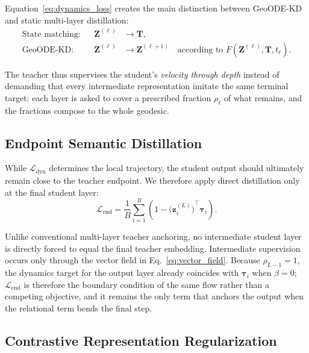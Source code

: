 \documentclass[11pt]{article}
\begin{document}
Equation~\eqref{eq:dynamics_loss} creates the main distinction between
GeoODE-KD and static multi-layer distillation:
\begin{align}
    \text{State matching:}
    &&
    \mathbf{Z}^{(\ell)}
    &\rightarrow
    \mathbf{T},
    \\
    \text{GeoODE-KD:}
    &&
    \mathbf{Z}^{(\ell)}
    &\rightarrow
    \mathbf{Z}^{(\ell+1)}
    \quad
    \text{according to }
    F(
        \mathbf{Z}^{(\ell)},\mathbf{T},t_\ell
    ).
\end{align}

The teacher thus supervises the student's \emph{velocity through depth}
instead of demanding that every intermediate representation imitate the
same terminal target: each layer is asked to cover a prescribed fraction
$\rho_\ell$ of what remains, and the fractions compose to the whole
geodesic.


\subsection{Endpoint Semantic Distillation}\label{sec:endpoint}

While $\mathcal{L}_{\mathrm{dyn}}$ determines the local trajectory, the
student output should ultimately remain close to the teacher endpoint.
We therefore apply direct distillation only at the final student layer:
\begin{equation}
    \boxed{
    \mathcal{L}_{\mathrm{end}}
    =
    \frac{1}{B}
    \sum_{i=1}^{B}
    \left(
        1-
        {\bigl(\mathbf{z}^{(L)}_i\bigr)}^\top
        \boldsymbol{\tau}_i
    \right)
    }.
    \label{eq:endpoint_loss}
\end{equation}

Unlike conventional multi-layer teacher anchoring, no intermediate student
layer is directly forced to equal the final teacher embedding. Intermediate
supervision occurs only through the vector field in
Eq.~\eqref{eq:vector_field}. Because $\rho_{L-1}=1$, the dynamics target
for the output layer already coincides with $\boldsymbol{\tau}_i$ when
$\beta=0$; $\mathcal{L}_{\mathrm{end}}$ is therefore the boundary
condition of the same flow rather than a competing objective, and it
remains the only term that anchors the output when the relational term
bends the final step.


\subsection{Contrastive Representation Regularization}\label{sec:contrastive}
\end{document}
